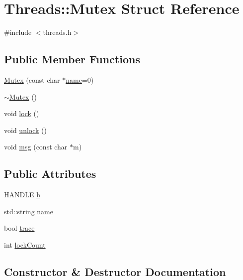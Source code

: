 \hypertarget{struct_threads_1_1_mutex}{}\section{Threads\+:\+:Mutex Struct Reference}
\label{struct_threads_1_1_mutex}


{\ttfamily \#include $<$threads.\+h$>$}

\subsection*{Public Member Functions}
\begin{DoxyCompactItemize}
\item 
\hyperlink{struct_threads_1_1_mutex_ad6a21c572100a6241fa34f1d265a2725}{Mutex} (const char $\ast$\hyperlink{struct_threads_1_1_mutex_aaf5798d7b45f171dbfa965e0508b884f}{name}=0)
\item 
\hyperlink{struct_threads_1_1_mutex_a34047e15c1aa45873ff56120d6c4d091}{$\sim$\+Mutex} ()
\item 
void \hyperlink{struct_threads_1_1_mutex_af3cb09072ecd935be502deb78f4519d5}{lock} ()
\item 
void \hyperlink{struct_threads_1_1_mutex_ad78fadce2239c6d359986e443822f6f6}{unlock} ()
\item 
void \hyperlink{struct_threads_1_1_mutex_a55226184bf80652bf23cf8790edd4b86}{msg} (const char $\ast$m)
\end{DoxyCompactItemize}
\subsection*{Public Attributes}
\begin{DoxyCompactItemize}
\item 
H\+A\+N\+D\+LE \hyperlink{struct_threads_1_1_mutex_a688cb7e044c7c8dc87e898bf88ff04d4}{h}
\item 
std\+::string \hyperlink{struct_threads_1_1_mutex_aaf5798d7b45f171dbfa965e0508b884f}{name}
\item 
bool \hyperlink{struct_threads_1_1_mutex_af7d136f3d4aadf1a23fc72e93b8a98a3}{trace}
\item 
int \hyperlink{struct_threads_1_1_mutex_a6bb290194be3b4d7668a743cb9398276}{lock\+Count}
\end{DoxyCompactItemize}


\subsection{Constructor \& Destructor Documentation}

